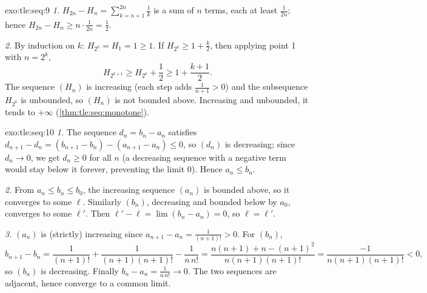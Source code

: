\begin{solution}{exo:tle:seq:9}
\emph{1.} $H_{2n} - H_n = \sum_{k=n+1}^{2n} \frac{1}{k}$ is a sum of $n$
terms, each at least $\frac{1}{2n}$; hence
$H_{2n} - H_n \geq n \cdot \frac{1}{2n} = \frac12$.

\emph{2.} By induction on $k$: $H_{2^0} = H_1 = 1 \geq 1$. If
$H_{2^k} \geq 1 + \frac{k}{2}$, then applying point 1 with $n = 2^k$,
\[
H_{2^{k+1}} \geq H_{2^k} + \frac12 \geq 1 + \frac{k+1}{2}.
\]
The sequence $(H_n)$ is increasing (each step adds $\frac{1}{n+1} > 0$) and
the subsequence $H_{2^k}$ is unbounded, so $(H_n)$ is not bounded above.
Increasing and unbounded, it tends to $+\infty$
(\cref{thm:tle:seq:monotone}).
\end{solution}

\begin{solution}{exo:tle:seq:10}
\emph{1.} The sequence $d_n = b_n - a_n$ satisfies
$d_{n+1} - d_n = (b_{n+1} - b_n) - (a_{n+1} - a_n) \leq 0$, so $(d_n)$ is
decreasing; since $d_n \to 0$, we get $d_n \geq 0$ for all $n$ (a decreasing
sequence with a negative term would stay below it forever, preventing the
limit $0$). Hence $a_n \leq b_n$.

\emph{2.} From $a_n \leq b_n \leq b_0$, the increasing sequence $(a_n)$ is
bounded above, so it converges to some $\ell$. Similarly $(b_n)$, decreasing
and bounded below by $a_0$, converges to some $\ell'$. Then
$\ell' - \ell = \lim (b_n - a_n) = 0$, so $\ell = \ell'$.

\emph{3.} $(a_n)$ is (strictly) increasing since
$a_{n+1} - a_n = \frac{1}{(n+1)!} > 0$. For $(b_n)$,
\[
b_{n+1} - b_n = \frac{1}{(n+1)!} + \frac{1}{(n+1)(n+1)!} - \frac{1}{n\,n!}
= \frac{n(n+1) + n - (n+1)^2}{n(n+1)(n+1)!}
= \frac{-1}{n(n+1)(n+1)!} < 0 ,
\]
so $(b_n)$ is decreasing. Finally $b_n - a_n = \frac{1}{n\,n!} \to 0$. The
two sequences are adjacent, hence converge to a common limit.
\end{solution}
